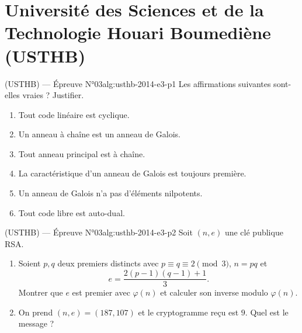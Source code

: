 \newpage

\section{Université des Sciences et de la Technologie Houari Boumediène (USTHB)}

\begin{problem}{(USTHB) — Épreuve N°03}{alg:usthb-2014-e3-p1}
Les affirmations suivantes sont-elles vraies ? Justifier.
\begin{enumerate}
\item Tout code linéaire est cyclique.
\item Un anneau à chaîne est un anneau de Galois.
\item Tout anneau principal est à chaîne.
\item La caractéristique d'un anneau de Galois est toujours première.
\item Un anneau de Galois n'a pas d'éléments nilpotents.
\item Tout code libre est auto-dual.
\end{enumerate}

\end{problem}

\newpage

\begin{problem}{(USTHB) — Épreuve N°03}{alg:usthb-2014-e3-p2}
Soit $(n,e)$ une clé publique RSA.
\begin{enumerate}
\item Soient $p,q$ deux premiers distincts avec $p\equiv q\equiv 2 \pmod 3$,
      $n=pq$ et
      $$
      e=\frac{2(p-1)(q-1)+1}{3}.
      $$
      Montrer que $e$ est premier avec $\varphi(n)$ et calculer son inverse modulo
      $\varphi(n)$.
\item On prend $(n,e)=(187,107)$ et le cryptogramme reçu est $9$. Quel est le
      message ?
\end{enumerate}

\end{problem}

\newpage

